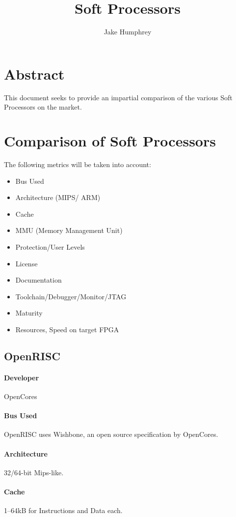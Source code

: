 \documentclass[11pt]{article} %
\title{Soft Processors}
\author{Jake Humphrey}
\begin{document}
\maketitle
\tableofcontents
\section{Abstract}
This document seeks to provide an impartial comparison of the various Soft Processors on the market.

\section{Comparison of Soft Processors}
The following metrics will be taken into account:
\begin{itemize}
\item Bus Used
\item Architecture (MIPS/ ARM)
\item Cache
\item MMU (Memory Management Unit)
\item Protection/User Levels
\item License
\item Documentation
\item Toolchain/Debugger/Monitor/JTAG
\item Maturity
\item Resources, Speed on target FPGA
\end{itemize}

\subsection{OpenRISC}
\paragraph{Developer} OpenCores
\paragraph{Bus Used} OpenRISC uses Wishbone, an open source specification by OpenCores.
\paragraph{Architecture} 32/64-bit Mips-like.
\paragraph{Cache} 1--64kB for Instructions and Data each.
\end{document}
